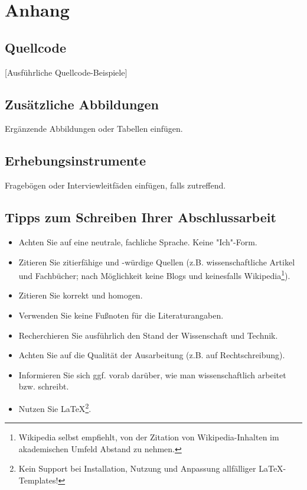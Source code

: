 \documentclass[oneside,bibliography=totocnumbered,BCOR=5mm]{scrbook}
\begin{document}
\chapter{Anhang}

\section{Quellcode}
[Ausführliche Quellcode-Beispiele]

\section{Zusätzliche Abbildungen}
Ergänzende Abbildungen oder Tabellen einfügen.

\section{Erhebungsinstrumente}
Fragebögen oder Interviewleitfäden einfügen, falls zutreffend.

\section{Tipps zum Schreiben Ihrer Abschlussarbeit}

\begin{itemize}
\item Achten Sie auf eine neutrale, fachliche Sprache. Keine "Ich"-Form.
\item Zitieren Sie zitierfähige und -würdige Quellen (z.B. wissenschaftliche Artikel und Fachbücher; nach Möglichkeit keine Blogs und keinesfalls Wikipedia\footnote{Wikipedia selbst empfiehlt, von der Zitation von Wikipedia-Inhalten im akademischen Umfeld Abstand zu nehmen.}).
\item Zitieren Sie korrekt und homogen.
\item Verwenden Sie keine Fußnoten für die Literaturangaben.
\item Recherchieren Sie ausführlich den Stand der Wissenschaft und Technik.
\item Achten Sie auf die Qualität der Ausarbeitung (z.B. auf Rechtschreibung).
\item Informieren Sie sich ggf. vorab darüber, wie man wissenschaftlich arbeitet bzw. schreibt.
\item Nutzen Sie \LaTeX\footnote{Kein Support bei Installation, Nutzung und Anpassung allfälliger \LaTeX-Templates!}.
\end{itemize}

\backmatter
\end{document}
